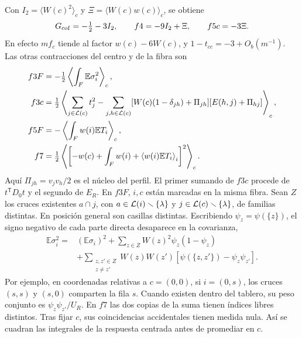 Con \(I_2=\langle W(c)^2\rangle_c\) y \(\Xi=\langle W(c)w(c)\rangle_c\), se obtiene
\[
 G_{\rm cof}=-\tfrac12-3I_2,\qquad f4=-9I_2+\Xi,\qquad f5c=-3\Xi .
\]
En efecto \(mf_c\) tiende al factor \(w(c)-6W(c)\), y \(1-t_{cc}=-3+O_b(m^{-1})\).
Las otras contracciones del centro y de la fibra son
\begin{align*}
 f3F&=-\tfrac12\left\langle\int_F\mathbb E\sigma_i^2\right\rangle_c,\\
 f3c&=\tfrac12\left\langle\sum_{j\in \mathcal L(c)}t_j^2
 -\sum_{j,h\in \mathcal L(c)}[W(c)(1-\delta_{jh})+\Pi_{jh}]
                         [E(h,j)+\Pi_{hj}]\right\rangle_c,\\
 f5F&=-\left\langle\int_F w(i)\mathbb E T_i\right\rangle_c,\\
 f7&=\tfrac12\left\langle\left[-w(c)+\int_F w(i)
                  +\left\langle w(i)\mathbb E T_i\right\rangle_i\right]^2\right\rangle_c .
\end{align*}
Aquí \(\Pi_{jh}=v_jv_h/2\) es el núcleo del perfil. El primer sumando de \(f3c\)
procede de \(t^{\mathsf T}D_0t\) y el segundo de \(E_R\).
En \(f3F\), \(i,c\) están marcadas en la misma fibra. Sean \(Z\) los cruces existentes
\(a\cap j\), con \(a\in \mathcal L(i)\smallsetminus\{\lambda\}\) y \(j\in \mathcal L(c)\smallsetminus\{\lambda\}\),
de familias distintas. En posición general son casillas distintas. Escribiendo
\(\psi_z=\psi(\{z\})\), el signo negativo de cada parte directa desaparece en la covarianza,
\begin{align*}
 \mathbb E\sigma_i^2={}&(\mathbb E\sigma_i)^2+\sum_{z\in Z}W(z)^2\psi_z(1-\psi_z)\\
 &+\sum_{\substack{z,z'\in Z\\z\ne z'}}W(z)W(z')
       [\psi(\{z,z'\})-\psi_z\psi_{z'}].
\end{align*}
Por ejemplo, en coordenadas relativas a \(c=(0,0)\), si \(i=(0,s)\), los cruces
\((s,s)\) y \((s,0)\) comparten la fila \(s\). Cuando existen dentro del tablero, su peso
conjunto es \(\psi_z\psi_{z'}/U_R\). En \(f7\) las dos copias de la suma tienen índices
libres distintos. Tras fijar \(c\), sus coincidencias accidentales tienen medida nula.
Así se cuadran las integrales de la respuesta centrada antes de promediar en \(c\).

